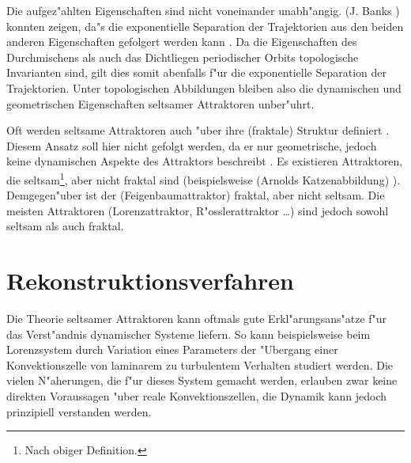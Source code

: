 Die aufgez"ahlten Eigenschaften sind nicht voneinander unabh"angig. \autor(J. Banks \etal)
konnten zeigen, da"s die exponentielle Separation der Trajektorien aus den beiden anderen
Eigenschaften gefolgert werden kann \cite{Banks92}. Da die Eigenschaften des Durchmischens
als auch das Dichtliegen periodischer Orbits topologische Invarianten sind, gilt
dies somit abenfalls f"ur die exponentielle Separation der Trajektorien. Unter
topologischen Abbildungen bleiben also die dynamischen und geometrischen Eigenschaften
seltsamer Attraktoren unber"uhrt.

Oft werden seltsame Attraktoren auch "uber ihre \begriff(fraktale) Struktur
definiert \cite{Peitgen92}. Diesem Ansatz soll hier nicht gefolgt werden, da er nur
geometrische, jedoch keine dynamischen Aspekte des Attraktors beschreibt
\cite{Eckmann-ruelle}. Es existieren Attraktoren, die seltsam\footnote{Nach obiger
Definition.}, aber nicht fraktal sind (beispielsweise \begriff(Arnolds Katzenabbildung)
\cite{Arnold68}). Demgegen"uber ist der \begriff(Feigenbaumattraktor) fraktal, aber nicht
seltsam. Die meisten Attraktoren (Lorenzattraktor, R"osslerattraktor \dots) sind jedoch
sowohl seltsam als auch fraktal.


\section{Rekonstruktionsverfahren}

Die Theorie seltsamer Attraktoren kann oftmals gute Erkl"arungsans"atze f"ur das Ver\-st"andnis
dynamischer Systeme liefern. So kann beispielsweise beim Lorenzsystem durch
Variation eines Parameters der "Ubergang einer Konvektionszelle
von laminarem zu turbulentem Verhalten studiert werden. Die vielen N"aherungen, die f"ur
dieses System gemacht werden, erlauben zwar keine direkten Voraussagen "uber reale 
Konvektionszellen, die Dynamik kann jedoch prinzipiell verstanden werden.

